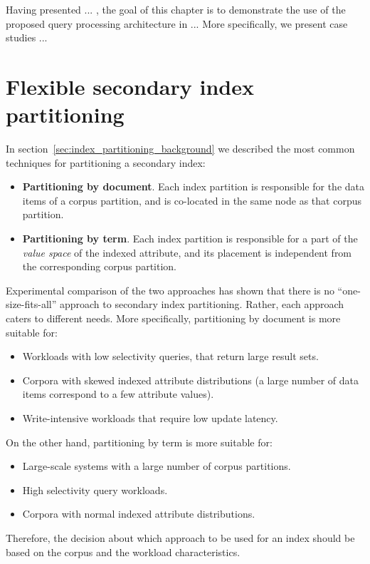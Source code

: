 Having presented ... ,
the goal of this chapter is to demonstrate the use of the proposed query processing architecture in ...
More specifically, we present case studies ...

\section{Flexible secondary index partitioning}
In section~\ref{sec:index_partitioning_background} we described the most common techniques for partitioning a secondary index:
\begin{itemize}
  \item \textbf{Partitioning by document}.
  Each index partition is responsible for the data items of a corpus partition,
  and is co-located in the same node as that corpus partition.
  \item \textbf{Partitioning by term}.
  Each index partition is responsible for a part of the \textit{value space} of the indexed attribute,
  and its placement is independent from the corresponding corpus partition.
\end{itemize}

Experimental comparison of the two approaches has shown \cite{dsilva:tworings, kejriwal:slik} that there is no ``one-size-fits-all'' approach to secondary
index partitioning.
Rather, each approach caters to different needs.
More specifically, partitioning by document is more suitable for:
\begin{itemize}
  \item Workloads with low selectivity queries, that return large result sets.
  \item Corpora with skewed indexed attribute distributions (a large number of data items correspond to a few attribute values).
  \item Write-intensive workloads that require low update latency.
\end{itemize}
\noindent
On the other hand, partitioning by term is more suitable for:
\begin{itemize}
  \item Large-scale systems with a large number of corpus partitions.
  \item High selectivity query workloads.
  \item Corpora with normal indexed attribute distributions.
\end{itemize}

Therefore, the decision about which approach to be used for an index should be based on the corpus and the workload characteristics.

